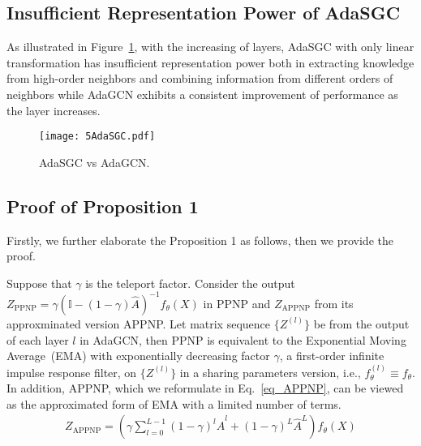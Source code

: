 \documentclass{article} \usepackage{iclr2021_conference,times}
\begin{document}
\subsection{Insufficient Representation Power of AdaSGC}
\label{sec:AdaSGC}
As illustrated in Figure~\ref{figure_AdaSGC}, with the increasing of layers, AdaSGC with only linear transformation has insufficient representation power both in extracting knowledge from high-order neighbors and combining information from different orders of neighbors while AdaGCN exhibits a consistent improvement of performance as the layer increases.

\begin{figure}[htbp]
	\centering
	\centering\texttt{[image: 5AdaSGC.pdf]}
	\caption{AdaSGC vs AdaGCN.}
	\label{figure_AdaSGC}
\end{figure}


\subsection{Proof of Proposition 1} \label{sec: proof_theorem1}
Firstly, we further elaborate the Proposition 1 as follows, then we provide the proof.

Suppose that $\gamma$ is the teleport factor. Consider the output $Z_{\text{PPNP}}=\gamma (\mathbb{I} - (1-\gamma)\hat{A})^{-1}f_{\theta}(X)$ in PPNP and $Z_{\text{APPNP}}$ from its approxminated version APPNP. Let matrix sequence $\{Z^{(l)}\}$ be from the output of each layer $l$ in AdaGCN, then PPNP is equivalent to the Exponential Moving Average~(EMA) with exponentially decreasing factor $\gamma$, a first-order infinite impulse response filter, on $\{Z^{(l)}\}$ in a sharing parameters version, i.e., $f_{\theta}^{(l)} \equiv f_{\theta}$. In addition, APPNP, which we reformulate in Eq.~\ref{eq_APPNP}, can be viewed as the approximated form of EMA with a limited number of terms. 
\begin{equation} 
\label{eq_APPNP}
\begin{aligned} 
Z_{\text{APPNP}}= (\gamma \sum_{l=0}^{L-1}(1-\gamma)^l \hat{A}^l + (1-\gamma)^L \hat{A}^L)f_{\theta}(X)
\end{aligned} 
\end{equation}
\end{document}
